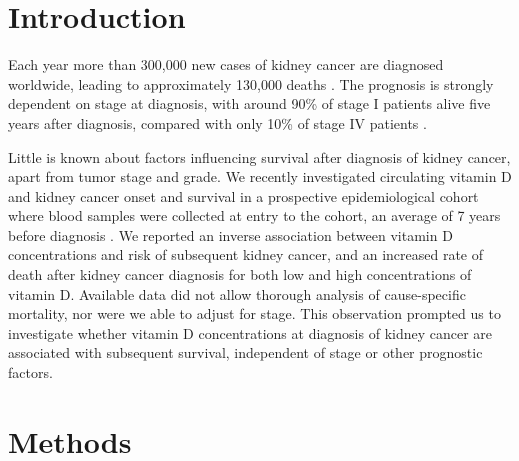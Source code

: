 \documentclass[a4paper,11pt]{article}
\begin{document}
\clearpage


\section*{Introduction}
Each year more than 300,000 new cases of kidney cancer are diagnosed worldwide, 
leading to approximately 130,000 deaths \cite{ferlay_cancer_2013}. The prognosis 
is strongly dependent on stage at diagnosis, with around 90\% of stage I 
patients alive five years after diagnosis, compared with only 10\% of stage IV 
patients \cite{CRUK_kidney_2014}.

Little is known about factors influencing survival after diagnosis of kidney 
cancer, apart from tumor stage and grade. We recently investigated circulating 
vitamin D and kidney cancer onset and survival in a prospective epidemiological 
cohort where blood samples were collected at entry to the cohort, an average 
of 7 years before diagnosis \cite{muller_circulating_2014}. We reported an inverse 
association between vitamin D concentrations and risk of subsequent kidney 
cancer, and an increased rate of death after kidney cancer diagnosis for both 
low and high concentrations of vitamin D. Available data did not allow thorough 
analysis of cause-specific mortality, nor were we able to adjust for stage. This 
observation prompted us to investigate whether vitamin D concentrations at  
diagnosis of kidney cancer are associated with subsequent survival, independent 
of stage or other prognostic factors.   

\section*{Methods}
\end{document}
